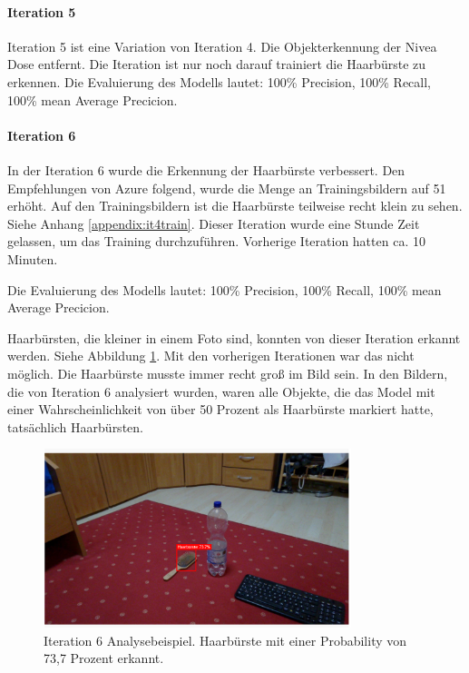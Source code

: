\paragraph{Iteration 5}

Iteration 5 ist eine Variation von Iteration 4. Die Objekterkennung der Nivea Dose entfernt. Die Iteration ist nur noch darauf trainiert die Haarbürste zu erkennen. Die Evaluierung des Modells lautet: 100\% Precision, 100\% Recall, 100\% mean Average Precicion.

\paragraph{Iteration 6}

In der Iteration 6 wurde die Erkennung der Haarbürste verbessert. Den Empfehlungen von Azure folgend, wurde die Menge an Trainingsbildern auf 51 erhöht. Auf den Trainingsbildern ist die Haarbürste teilweise recht klein zu sehen. Siehe Anhang \ref{appendix:it4train}. Dieser Iteration wurde eine Stunde Zeit gelassen, um das Training durchzuführen. Vorherige Iteration hatten ca. 10 Minuten.

Die Evaluierung des Modells lautet: 100\% Precision, 100\% Recall, 100\% mean Average Precicion. 

Haarbürsten, die kleiner in einem Foto sind, konnten von dieser Iteration erkannt werden. Siehe Abbildung \ref{img:it6}. Mit den vorherigen Iterationen war das nicht möglich. Die Haarbürste musste immer recht groß im Bild sein. In den Bildern, die von Iteration 6 analysiert wurden, waren alle Objekte, die das Model mit einer Wahrscheinlichkeit von über 50 Prozent als Haarbürste markiert hatte, tatsächlich Haarbürsten.

\begin{figure}[H]
	\centering
	\includegraphics[width=0.8\textwidth]{images/it6pretty.png}
	\caption[Iteration 6 Analysebeispiel]{Iteration 6 Analysebeispiel. Haarbürste mit einer Probability von 73,7 Prozent erkannt.}
	\label{img:it6}
\end{figure}


